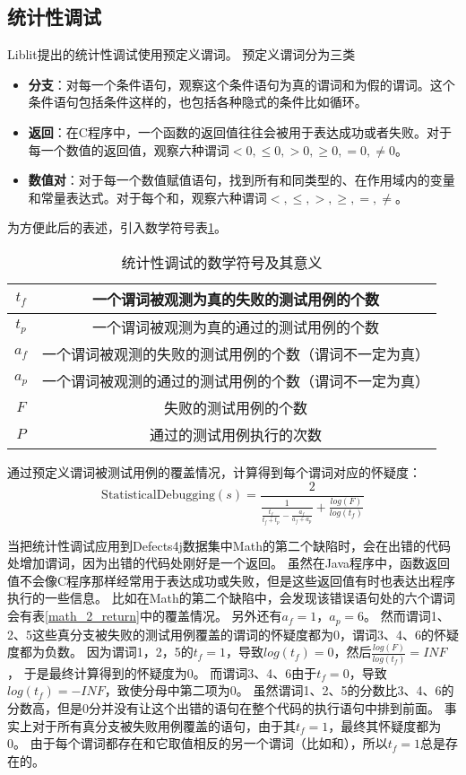 \subsection{统计性调试}

Liblit\parencite{Liblit2005Scalable}提出的统计性调试使用预定义谓词。
预定义谓词分为三类
\begin{itemize}
\item \textbf{分支}：对每一个条件语句，观察这个条件语句为真的谓词和为假的谓词。这个条件语句包括条件这样的，也包括各种隐式的条件比如循环。
\item \textbf{返回}：在C程序中，一个函数的返回值往往会被用于表达成功或者失败。对于每一个数值的返回值，观察六种谓词$< 0, \le 0, > 0, \ge 0, = 0, \ne 0$。
\item \textbf{数值对}：对于每一个数值赋值语句，找到所有和同类型的、在作用域内的变量和常量表达式。对于每个和，观察六种谓词$<, \le, >, \ge, =, \ne$。
\end{itemize}
为方便此后的表述，引入数学符号表\ref{state_symbol}。
\begin{table}
\centering
\begin{tabular}{|c|c|}
\hline
$t_f$ & 一个谓词被观测为真的失败的测试用例的个数 \\
\hline
$t_p$ & 一个谓词被观测为真的通过的测试用例的个数 \\
\hline
$a_f$ & 一个谓词被观测的失败的测试用例的个数（谓词不一定为真）\\
\hline
$a_p$ & 一个谓词被观测的通过的测试用例的个数（谓词不一定为真）\\
\hline
$F$ & 失败的测试用例的个数 \\
\hline
$P$ & 通过的测试用例执行的次数 \\
\hline
\end{tabular}
\caption{统计性调试的数学符号及其意义}
\label{state_symbol}
\end{table}

通过预定义谓词被测试用例的覆盖情况，计算得到每个谓词对应的怀疑度：
$$
\mathrm{StatisticalDebugging}(s) = \frac{2}{\frac{1}{\frac{t_f}{t_f + t_p} - \frac{a_f}{a_f + a_p}} + \frac{log(F)}{log(t_f)}}\label{eq:sd}
$$

当把统计性调试应用到Defects4j数据集中Math的第二个缺陷时，会在出错的代码处增加谓词，因为出错的代码处刚好是一个返回。
虽然在Java程序中，函数返回值不会像C程序那样经常用于表达成功或失败，但是这些返回值有时也表达出程序执行的一些信息。
比如在Math的第二个缺陷中，会发现该错误语句处的六个谓词会有表\ref{math_2_return}中的覆盖情况。
另外还有$a_f = 1$，$a_p = 6$。
然而谓词1、2、5这些真分支被失败的测试用例覆盖的谓词的怀疑度都为0，谓词3、4、6的怀疑度都为负数。
因为谓词1，2，5的$t_f = 1$，导致$log(t_f) = 0$，然后$\frac{log(F)}{log(t_f)} = INF$，
于是最终计算得到的怀疑度为0。
而谓词3、4、6由于$t_f = 0$，导致$log(t_f) = -INF$，致使分母中第二项为0。
虽然谓词1、2、5的分数比3、4、6的分数高，但是0分并没有让这个出错的语句在整个代码的执行语句中排到前面。
事实上对于所有真分支被失败用例覆盖的语句，由于其$t_f = 1$，最终其怀疑度都为0。
由于每个谓词都存在和它取值相反的另一个谓词（比如和），所以$t_f = 1$总是存在的。

